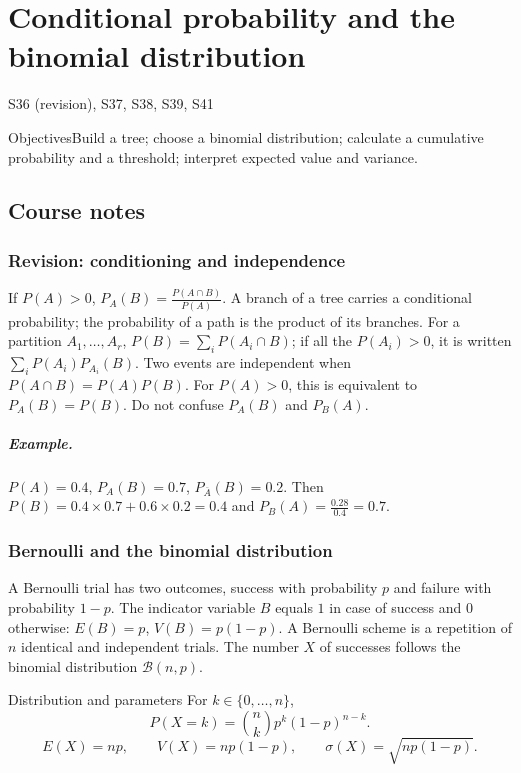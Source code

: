 \setcounter{chapter}{12}\chapter{Conditional probability and the binomial distribution}\label{ch:13}

{\small\sffamily\color{teal}S36 (revision), S37, S38, S39, S41\par}

\begin{retenir}{Objectives}Build a tree; choose a binomial distribution; calculate a cumulative probability and a threshold; interpret expected value and variance.\end{retenir}

\section{Course notes}
\subsection{Revision: conditioning and independence}
If $P(A)>0$, $P_A(B)=\frac{P(A\cap B)}{P(A)}$. A branch of a tree carries a conditional probability; the probability of a path is the product of its branches. For a partition $A_1,\ldots,A_r$, $P(B)=\sum_iP(A_i\cap B)$; if all the $P(A_i)>0$, it is written $\sum_iP(A_i)P_{A_i}(B)$.
Two events are independent when $P(A\cap B)=P(A)P(B)$. For $P(A)>0$, this is equivalent to $P_A(B)=P(B)$. Do not confuse $P_A(B)$ and $P_B(A)$.
\paragraph{Example.} $P(A)=0.4$, $P_A(B)=0.7$, $P_{\overline A}(B)=0.2$. Then $P(B)=0.4\times0.7+0.6\times0.2=0.4$ and $P_B(A)=\frac{0.28}{0.4}=0.7$.
\subsection{Bernoulli and the binomial distribution}
A Bernoulli trial has two outcomes, success with probability $p$ and failure with probability $1-p$. The indicator variable $B$ equals $1$ in case of success and $0$ otherwise: $E(B)=p$, $V(B)=p(1-p)$.
A Bernoulli scheme is a repetition of $n$ identical and independent trials. The number $X$ of successes follows the binomial distribution $\mathcal B(n,p)$.
\begin{retenir}{Distribution and parameters}
For $k\in\{0,\ldots,n\}$,
\[P(X=k)=\binom nk p^k(1-p)^{n-k}.\]\[E(X)=np,\qquad V(X)=np(1-p),\qquad\sigma(X)=\sqrt{np(1-p)}.\]
\end{retenir}
